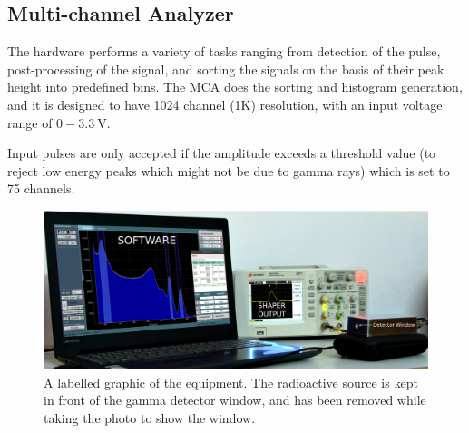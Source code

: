 \documentclass[%
 reprint,
nofootinbib,
 amsmath,amssymb,
 aps,
floatfix,
]{revtex4-2}
\begin{document}
    \subsection{Multi-channel Analyzer}
    The hardware performs a variety of tasks ranging from detection of the pulse, post-processing of the signal, and sorting the signals on the basis of their peak height into predefined bins. The MCA does the sorting and histogram generation, and it is designed to have 1024 channel (1K) resolution, with an input voltage range of $0-\SI{3.3}{\volt}$.
    \par
    Input pulses are only accepted if the amplitude exceeds a threshold value (to reject low energy peaks which might not be due to gamma rays) which is set to 75 channels.
    \begin{figure}
        \centering
        \includegraphics[scale = 0.33]{Figures/setup.png}
        \caption{A labelled graphic of the equipment. The radioactive source is kept in front of the gamma detector window, and has been removed while taking the photo to show the window.}
        \label{fig:setup}
    \end{figure}
    
    
\end{document}
